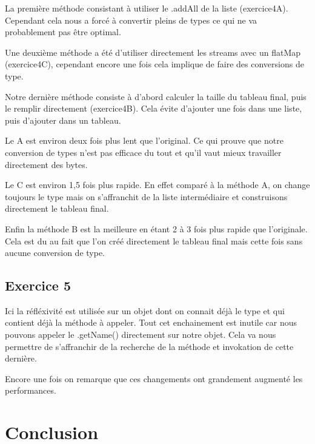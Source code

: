 \documentclass{report}
\begin{document}
		La première méthode consistant à utiliser le .addAll de la liste (exercice4A).
		Cependant cela nous a forcé à convertir pleins de types ce qui ne va probablement pas être optimal.
		
		Une deuxième méthode a été d'utiliser directement les streams avec un flatMap (exercice4C), cependant encore une fois cela implique de faire des conversions de type.
		
		Notre dernière méthode consiste à d'abord calculer la taille du tableau final, puis le remplir directement (exercice4B).
		Cela évite d'ajouter une fois dans une liste, puis d'ajouter dans un tableau.
		
		
		
		Le A est environ deux fois plus lent que l'original.
		Ce qui prouve que notre conversion de types n'est pas efficace du tout et qu'il vaut mieux travailler directement des bytes.
		
		Le C est environ 1,5 fois plus rapide.
		En effet comparé à la méthode A, on change toujours le type mais on s'affranchit de la liste intermédiaire et construisons directement le tableau final.
		
		Enfin la méthode B est la meilleure en étant 2 à 3 fois plus rapide que l'originale.
		Cela est du au fait que l'on créé directement le tableau final mais cette fois sans aucune conversion de type.
	
	\section{Exercice 5}
		Ici la réfléxivité est utilisée sur un objet dont on connait déjà le type et qui contient déjà la méthode à appeler.
		Tout cet enchainement est inutile car nous pouvons appeler le .getName() directement sur notre objet.
		Cela va nous permettre de s'affranchir de la recherche de la méthode et invokation de cette dernière.
		
		
		
		Encore une fois on remarque que ces changements ont grandement augmenté les performances.
	
	\chapter{Conclusion}
\end{document}

